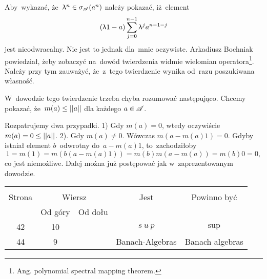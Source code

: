 \documentclass[a4paper,11pt]{article}
\begin{document}
\start {} 
Aby~wykazać, że~$\uplambda^{ n } \in \sigma_{ \mathcal{ A } }( a^{ n })$ należy
pokazać, iż~element
\begin{equation}
  \label{eq:DE-1}
  ( \uplambda 1 - a ) \sum\limits_{ j = 0 }^{ n - 1 } \uplambda^{ j } a^{ n - 1 - j }
\end{equation}
jest nieodwracalny. Nie jest to jednak dla~mnie oczywiste. Arkadiusz
Bochniak powiedział, żeby zobaczyć na~dowód twierdzenia widmie
wielomian operatora\footnote{Ang. polynomial spectral mapping
  theorem.}. Należy przy tym zauważyć, że~z~tego twierdzenie wynika
od~razu poszukiwana własność.

\vspace{\spaceFour}


\start {}  W~dowodzie tego twierdzenie trzeba
chyba rozumować następująco. Chcemy pokazać,
że~$m( a ) \leq \left|\left|  a  \right|\right|$ dla każdego $a \in \mathcal{A}$.

Rozpatrujemy dwa przypadki. 1) Gdy $m( a ) = 0$, wtedy oczywiście
$m( a ) = 0 \leq \left|\left|  a  \right|\right|$. 2). Gdy $m( a ) \neq 0$. Wówczas
$m( a - m( a ) 1 ) = 0$. Gdyby istniał element $b$~odwrotny
do~$a - m( a ) 1$, to~zachodziłoby
\begin{equation}
  1 = m( 1 ) = m( b ( a - m( a ) 1 ) ) = m( b ) m( a - m( a ) )
  = m( b ) 0 = 0,
\end{equation}
co jest niemożliwe. Dalej można już postępować jak w~zaprezentowanym
dowodzie.


\begin{center}
  \begin{tabular}{|c|c|c|c|c|}
    \hline
    & \multicolumn{2}{c|}{} & & \\
    Strona & \multicolumn{2}{c|}{Wiersz} & Jest
                              & Powinno być \\ \cline{2-3}
    & Od góry & Od dołu & & \\
    \hline
    42  & 10 & & $s\: u\: p$ & $\sup$ \\
    44  &  9 & & Banach-Algebras & Banach algebras \\
    \hline
  \end{tabular}
\end{center}

\vspace{\spaceTwo}
\end{document}
